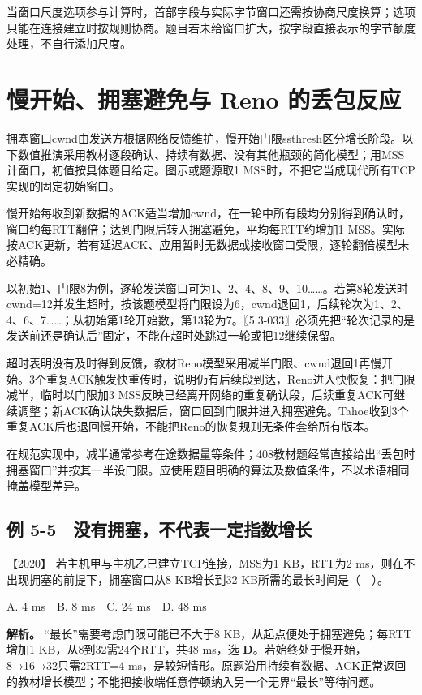 当窗口尺度选项参与计算时，首部字段与实际字节窗口还需按协商尺度换算；选项只能在连接建立时按规则协商。题目若未给窗口扩大，按字段直接表示的字节额度处理，不自行添加尺度。

\section{慢开始、拥塞避免与 Reno 的丢包反应}\label{cn-05-08}

拥塞窗口cwnd由发送方根据网络反馈维护，慢开始门限ssthresh区分增长阶段。以下数值推演采用教材逐段确认、持续有数据、没有其他瓶颈的简化模型；用MSS计窗口，初值按具体题目给定。图示或题源取1 MSS时，不把它当成现代所有TCP实现的固定初始窗口。

慢开始每收到新数据的ACK适当增加cwnd，在一轮中所有段均分别得到确认时，窗口约每RTT翻倍；达到门限后转入拥塞避免，平均每RTT约增加1 MSS。实际按ACK更新，若有延迟ACK、应用暂时无数据或接收窗口受限，逐轮翻倍模型未必精确。

以初始1、门限8为例，逐轮发送窗口可为1、2、4、8、9、10\ldots\ldots。若第8轮发送时cwnd=12并发生超时，按该题模型将门限设为6，cwnd退回1，后续轮次为1、2、4、6、7\ldots\ldots；从初始第1轮开始数，第13轮为7。〖5.3-033〗必须先把``轮次记录的是发送前还是确认后''固定，不能在超时处跳过一轮或把12继续保留。

超时表明没有及时得到反馈，教材Reno模型采用减半门限、cwnd退回1再慢开始。3个重复ACK触发快重传时，说明仍有后续段到达，Reno进入快恢复：把门限减半，临时以门限加3 MSS反映已经离开网络的重复确认段，后续重复ACK可继续调整；新ACK确认缺失数据后，窗口回到门限并进入拥塞避免。Tahoe收到3个重复ACK后也退回慢开始，不能把Reno的恢复规则无条件套给所有版本。

在规范实现中，减半通常参考在途数据量等条件；408教材题经常直接给出``丢包时拥塞窗口''并按其一半设门限。应使用题目明确的算法及数值条件，不以术语相同掩盖模型差异。

\subsection{例 5-5　没有拥塞，不代表一定指数增长}\label{cn-ex5-5}

\noindent{}【2020】 若主机甲与主机乙已建立TCP连接，MSS为1 KB，RTT为2 ms，则在不出现拥塞的前提下，拥塞窗口从8 KB增长到32 KB所需的最长时间是（　）。

A. 4 ms　B. 8 ms　C. 24 ms　D. 48 ms


\textbf{解析。} ``最长''需要考虑门限可能已不大于8 KB，从起点便处于拥塞避免；每RTT增加1 KB，从8到32需24个RTT，共48 ms，选 \textbf{D}。若始终处于慢开始，8→16→32只需2RTT=4 ms，是较短情形。原题沿用持续有数据、ACK正常返回的教材增长模型；不能把接收端任意停顿纳入另一个无界``最长''等待问题。

